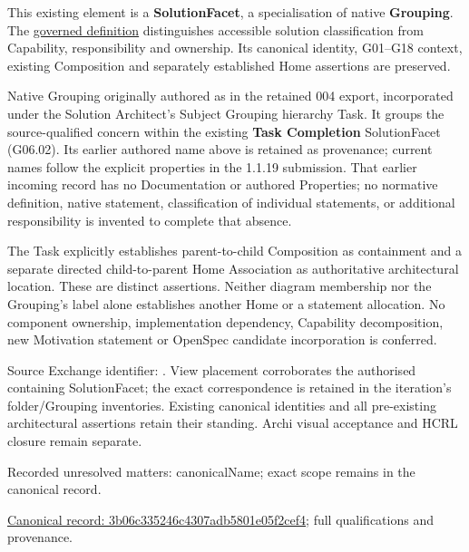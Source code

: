 This existing element is a \textbf{SolutionFacet}, a specialisation of native
\textbf{Grouping}. The \href{\detokenize{../../../../../../../governance/continuum-representation.md#solutionfacet-classification--1119-candidate}}{governed definition}
distinguishes accessible solution classification from Capability, responsibility
and ownership. Its canonical identity, G01–G18 context, existing Composition
and separately established Home assertions are preserved.



Native Grouping originally authored as \texttt{} in the retained 004 export,
incorporated under the Solution Architect's Subject Grouping hierarchy Task.
It groups the source-qualified \texttt{} concern within
the existing \textbf{Task Completion} SolutionFacet (G06.02). Its earlier authored name above is retained as provenance; current names
follow the explicit properties in the 1.1.19 submission.
That earlier incoming record has no Documentation or authored Properties; no normative
definition, native statement, classification of individual statements, or
additional responsibility is invented to complete that absence.



The Task explicitly establishes parent-to-child Composition as containment and
a separate directed child-to-parent Home Association as authoritative architectural
location. These are distinct assertions. Neither diagram membership nor the
Grouping's label alone establishes another Home or a statement allocation.
No component ownership, implementation dependency, Capability decomposition,
new Motivation statement or OpenSpec candidate incorporation is conferred.



Source Exchange identifier: \texttt{}. View placement corroborates
the authorised containing SolutionFacet; the exact correspondence is retained in the
iteration's folder/Grouping inventories. Existing canonical identities and all
pre-existing architectural assertions retain their standing. Archi visual
acceptance and HCRL closure remain separate.


{\small Recorded unresolved matters: canonicalName; exact scope remains in the canonical record.}\par
{\footnotesize \href{../../../../../../../continuum/grouping/3b06c335246c4307adb5801e05f2cef4.md}{Canonical record: 3b06c335246c4307adb5801e05f2cef4}; full qualifications and provenance.}\par
